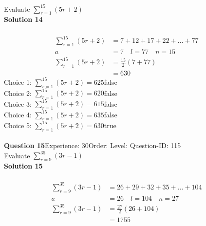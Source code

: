 \documentclass{article}
\begin{document}
Evaluate $\displaystyle\sum_{r=1}^{15} (5r+2)$\\[4pt]
\noindent\textbf{Solution 14}\\[2pt]
\\[-35pt]\begin{align*}
\displaystyle\sum_{r=1}^{15} (5r+2)&=7+12+17+22+...+77\\[2pt]
a&=7\quad l=77 \quad n=15\\[2pt]
\displaystyle\sum_{r=1}^{15} (5r+2)&=\displaystyle\frac{15}{2}(7+77)\\[2pt]
&=630
\end{align*}
Choice 1: \hspace{20pt}$\displaystyle\sum_{r=1}^{15} (5r+2)=625$\hspace{20pt}false\\
Choice 2: \hspace{20pt}$\displaystyle\sum_{r=1}^{15} (5r+2)=620$\hspace{20pt}false\\
Choice 3: \hspace{20pt}$\displaystyle\sum_{r=1}^{15} (5r+2)=615$\hspace{20pt}false\\
Choice 4: \hspace{20pt}$\displaystyle\sum_{r=1}^{15} (5r+2)=635$\hspace{20pt}false\\
Choice 5: \hspace{20pt}$\displaystyle\sum_{r=1}^{15} (5r+2)=630$\hspace{20pt}true\\
\\[4pt]
\noindent\textbf{Question 15}\hspace{20pt}Experience: 30\hspace{20pt}Order: \hspace{20pt}Level: \hspace{20pt}Question-ID: 115\\[2pt]
Evaluate $\displaystyle\sum_{r=9}^{35} (3r-1)$\\[4pt]
\noindent\textbf{Solution 15}\\[2pt]
\\[-35pt]\begin{align*}
\displaystyle\sum_{r=9}^{35} (3r-1)&=26+29+32+35+...+104\\[2pt]
a&=26\quad l=104 \quad n=27\\[2pt]
\displaystyle\sum_{r=9}^{35} (3r-1)&=\displaystyle\frac{27}{2}(26+104)\\[2pt]
&=1755
\end{align*}
\end{document}
